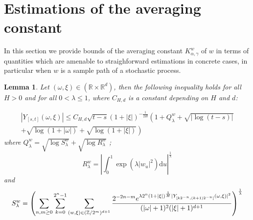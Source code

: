 \documentclass[11pt,a4paper,draft,reqno]{amsart}
\newtheorem{lemma}{Lemma}
\theoremstyle{definition}
\newcommand{\RR}{\mathbb{R}}
\newcommand{\ZZ}{\mathbb{Z}}
\newcommand{\dd}{\mathrm{d}}
\begin{document}
\section{Estimations of the averaging constant}

\label{sec:est-averaging}

In this section we provide bounds of the averaging constant $K^w_{\alpha,\gamma}$ of $w$ in terms of quantities which are  amenable to straighforward estimations in concrete cases, in particular when $w$ is a sample path of a stochastic process. 

\begin{lemma}\label{lemma majoration 1/2}
Let $(\omega,\xi)\in (\RR\times\RR^d)$, then the following inequality holds for all $H>0$ and for all $0<\lambda\le 1$, where $C_{H,d}$ is a constant depending on $H$ and $d$:

\begin{equation*}
\begin{split}\left|Y_{[s,t]}(\omega,\xi)\right| \le 
C_{H,d} \sqrt{t-s}(1+|\xi|)^{-\frac 1 {2H}}\left(1+ Q^w_\lambda+\sqrt{|\log (t-s)|} \right.\\ \left.+ \sqrt{\log (1+ |\omega|)} + \sqrt{\log (1+ |\xi|)} \right)
\end{split}
 \end{equation*}
where $Q^w_\lambda=\sqrt{\log S^w_\lambda}+\sqrt{\log R^w_\lambda}$ ;
$$
 R^w_\lambda = \left|\int_0^1 \exp\left(\lambda|w_u|^2\right)\dd u\right|^{\frac1\lambda}
$$
and
\begin{multline*}
S^w_\lambda =
\left(\sum_{n,m \ge 0}
	\sum_{k=0}^{2^n-1}
		\sum_{(w,\xi) \in (\ZZ/2^m)^{d+1}} \frac{2^{-2n-m}
		e^{\lambda 2^{n} (1+|\xi|)^{\frac 1 H} |Y_{[ k {2^{-n}}, {(k+1)} {2^{-n}}]}\left(\omega,\xi\right)|^2}}{(|\omega|+1)^{2}(|\xi|+1)^{d+1}}	%
					\vphantom{\sum_{n,m \ge 0}}
\right)^{\frac 1 \lambda}
\end{multline*}
\end{lemma}
\end{document}

